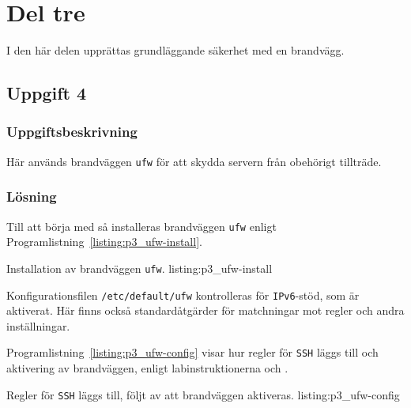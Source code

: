 %
%
%


\section{Del tre}
I den här delen upprättas grundläggande säkerhet med en brandvägg.


\subsection{Uppgift 4}
\subsubsection{Uppgiftsbeskrivning}
Här används brandväggen \texttt{ufw} för att skydda servern från obehörigt
tillträde.

\subsubsection{Lösning}
Till att börja med så installeras brandväggen \texttt{ufw} enligt 
Programlistning~\ref{listing:p3_ufw-install}.

            {Installation av brandväggen \texttt{ufw}.}
            {listing:p3_ufw-install}

Konfigurationsfilen \texttt{/etc/default/ufw} kontrolleras för
\texttt{IPv6}-stöd, som är aktiverat. Här finns också standardåtgärder för
matchningar mot regler och andra inställningar.

Programlistning~\ref{listing:p3_ufw-config} visar hur regler för \texttt{SSH}
läggs till och aktivering av brandväggen, enligt
labinstruktionerna\cite{dvg001:instruktionerLab5} och \cite{ubuntu:ufw}.

            {Regler för \texttt{SSH} läggs till, följt av att brandväggen
             aktiveras.}
            {listing:p3_ufw-config}


